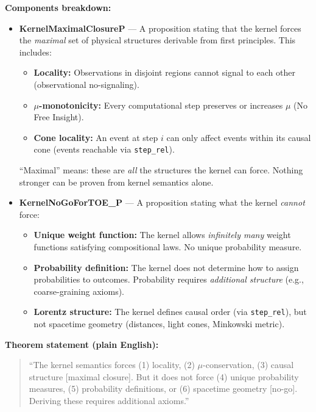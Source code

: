 \textbf{Components breakdown:}
\begin{itemize}
    \item \textbf{KernelMaximalClosureP} — A proposition stating that the kernel forces the \textit{maximal} set of physical structures derivable from first principles. This includes:
    \begin{itemize}
        \item \textbf{Locality:} Observations in disjoint regions cannot signal to each other (observational no-signaling).
        \item \textbf{$\mu$-monotonicity:} Every computational step preserves or increases $\mu$ (No Free Insight).
        \item \textbf{Cone locality:} An event at step $i$ can only affect events within its causal cone (events reachable via \texttt{step\_rel}).
    \end{itemize}
    ``Maximal'' means: these are \textit{all} the structures the kernel can force. Nothing stronger can be proven from kernel semantics alone.
    
    \item \textbf{KernelNoGoForTOE\_P} — A proposition stating what the kernel \textit{cannot} force:
    \begin{itemize}
        \item \textbf{Unique weight function:} The kernel allows \textit{infinitely many} weight functions satisfying compositional laws. No unique probability measure.
        \item \textbf{Probability definition:} The kernel does not determine how to assign probabilities to outcomes. Probability requires \textit{additional structure} (e.g., coarse-graining axioms).
        \item \textbf{Lorentz structure:} The kernel defines causal order (via \texttt{step\_rel}), but not spacetime geometry (distances, light cones, Minkowski metric).
    \end{itemize}
\end{itemize}

\textbf{Theorem statement (plain English):}
\begin{quote}
``The kernel semantics forces (1) locality, (2) $\mu$-conservation, (3) causal structure [maximal closure]. But it does not force (4) unique probability measures, (5) probability definitions, or (6) spacetime geometry [no-go]. Deriving these requires additional axioms.''
\end{quote}

